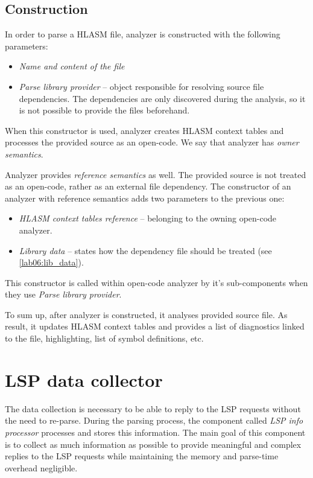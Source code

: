 \subsection{Construction}

In order to parse a HLASM file, analyzer is constructed with the following parameters:
\begin{itemize}
	\item \emph{Name and content of the file}
	\item \emph{Parse library provider} -- object responsible for resolving source file dependencies. The dependencies are only discovered during the analysis, so it is not possible to provide the files beforehand.
\end{itemize}

When this constructor is used, analyzer creates HLASM context tables and processes the provided source as an open-code. We say that analyzer has \emph{owner semantics}. 
 
Analyzer provides \emph{reference semantics} as well. The provided source is not treated as an open-code, rather as an external file dependency. The constructor of an analyzer with reference semantics adds two parameters to the previous one:
\begin{itemize}
	\item \emph{HLASM context tables reference} -- belonging to the owning open-code analyzer.
	\item \emph{Library data} -- states how the dependency file should be treated (see \cref{lab06:lib_data}).
\end{itemize}

This constructor is called within open-code analyzer by it's sub-components when they use \emph{Parse library provider}.

\vspace{0.5cm}

To sum up, after analyzer is constructed, it analyses provided source file. As result, it updates HLASM context tables and provides a list of diagnostics linked to the file, highlighting, list of symbol definitions, etc.

\section{LSP data collector}

The data collection is necessary to be able to reply to the LSP requests without the need to re-parse. During the parsing process, the component called \emph{LSP info processor} processes and stores this information. The main goal of this component is to collect as much information as possible to provide meaningful and complex replies to the LSP requests while maintaining the memory and parse-time overhead negligible.

